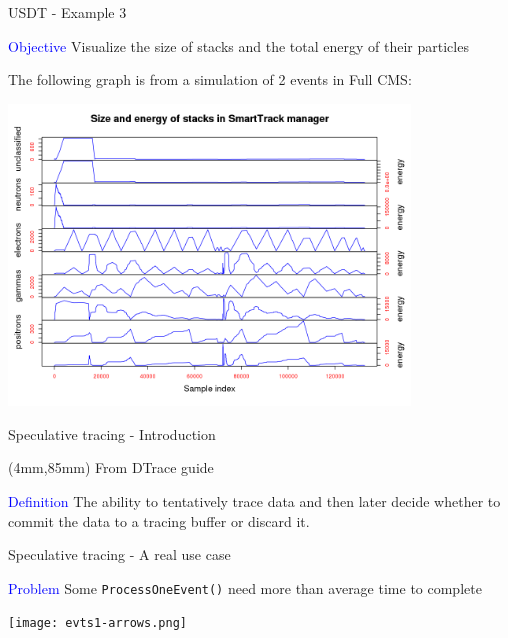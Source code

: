 \documentclass{beamer}
\newenvironment{reference}[2]{%
  \begin{textblock*}{\textwidth}(#1,#2) 
      \tiny\bgroup\color{red!50!black}}{\egroup\end{textblock*}}
\begin{document}
\begin{frame}{USDT - Example 3}

\textcolor{blue}{Objective} Visualize the size of stacks and the total energy of their particles

\vspace{1mm}

The following graph is from a simulation of 2 events in Full CMS:

\begin{center}
  \includegraphics[width=0.8\textwidth]{smarttracksize-ts-2evts-energy.png}
\end{center}
\end{frame}

\begin{frame}{Speculative tracing - Introduction}
\begin{reference}{4mm}{85mm}
From DTrace guide
\end{reference} 
\textcolor{blue}{Definition} The ability to tentatively trace data and then later decide whether to commit
the data to a tracing buffer or discard it.
\end{frame}

\begin{frame}{Speculative tracing - A real use case}

\textcolor{blue}{Problem} Some {\tt ProcessOneEvent()} need more than average time to complete

\begin{center}
  \texttt{[image: evts1-arrows.png]}
\end{center}
\end{frame}
\end{document}
